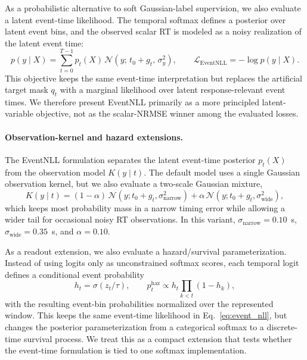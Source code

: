 \documentclass[12pt]{article}
\begin{document}
As a probabilistic alternative to soft Gaussian-label supervision, we also evaluate a latent event-time likelihood. The temporal softmax defines a posterior over latent event bins, and the observed scalar RT is modeled as a noisy realization of the latent event time:
\begin{equation}
\label{eq:event_nll}
p(y\mid X)
= \sum_{t=0}^{T-1} p_t(X)\,
\mathcal{N}\!\left(y;\,t_0 + g_t,\,\sigma_y^2\right),
\qquad
\mathcal{L}_{\mathrm{EventNLL}} = -\log p(y\mid X).
\end{equation}
This objective keeps the same event-time interpretation but replaces the artificial target mask $q_t$ with a marginal likelihood over latent response-relevant event times. We therefore present EventNLL primarily as a more principled latent-variable objective, not as the scalar-NRMSE winner among the evaluated losses.

\paragraph{Observation-kernel and hazard extensions.}
The EventNLL formulation separates the latent event-time posterior $p_t(X)$ from the observation model $K(y\mid t)$. The default model uses a single Gaussian observation kernel, but we also evaluate a two-scale Gaussian mixture,
\begin{equation}
\label{eq:event_nll_mixture_kernel}
K(y\mid t)=(1-\alpha)\,\mathcal{N}(y;t_0+g_t,\sigma_{\mathrm{narrow}}^2)
+\alpha\,\mathcal{N}(y;t_0+g_t,\sigma_{\mathrm{wide}}^2),
\end{equation}
which keeps most probability mass in a narrow timing error while allowing a wider tail for occasional noisy RT observations. In this variant, $\sigma_{\mathrm{narrow}}=0.10$~s, $\sigma_{\mathrm{wide}}=0.35$~s, and $\alpha=0.10$.

As a readout extension, we also evaluate a hazard/survival parameterization. Instead of using logits only as unconstrained softmax scores, each temporal logit defines a conditional event probability
\begin{equation}
\label{eq:hazard_readout}
h_t=\sigma(z_t/\tau),\qquad
p_t^{\mathrm{haz}} \propto h_t\prod_{k<t}(1-h_k),
\end{equation}
with the resulting event-bin probabilities normalized over the represented window. This keeps the same event-time likelihood in Eq.~\ref{eq:event_nll}, but changes the posterior parameterization from a categorical softmax to a discrete-time survival process. We treat this as a compact extension that tests whether the event-time formulation is tied to one softmax implementation.
\end{document}
